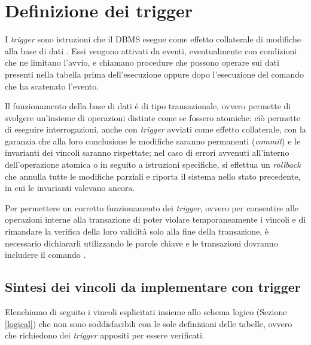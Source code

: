 \FloatBarrier

\section{Definizione dei trigger}
\label{physicaltriggers}

I \emph{trigger} sono istruzioni che il DBMS esegue come effetto collaterale di modifiche alla base di dati \cite{Sil11}.
Essi vengono attivati da eventi, eventualmente con condizioni che ne limitano l'avvio, e chiamano procedure che possono operare sui dati presenti nella tabella prima dell'esecuzione oppure dopo l'esecuzione del comando che ha scatenato l'evento.

Il funzionamento della base di dati è di tipo transazionale, ovvero permette di svolgere un'insieme di operazioni distinte come se fossero atomiche: ciò permette di eseguire interrogazioni, anche con \emph{trigger} avviati come effetto collaterale, con la garanzia che alla loro conclusione le modifiche saranno permanenti (\emph{commit}) e le invarianti dei vincoli saranno rispettate; nel caso di errori avvenuti all'interno dell'operazione atomica o in seguito a istruzioni specifiche, si effettua un \emph{rollback} che annulla tutte le modifiche parziali e riporta il sistema nello stato precedente, in cui le invarianti valevano ancora.

Per permettere un corretto funzionamento dei \emph{trigger}, ovvero per consentire alle operazioni interne alla transazione di poter violare temporaneamente i vincoli e di rimandare la verifica della loro validità solo alla fine della transazione, è necessario dichiararli utilizzando le parole chiave  e le transazioni dovranno includere il comando .

\subsection{Sintesi dei vincoli da implementare con trigger}
\label{physicaltriggerssynthesis}

Elenchiamo di seguito i vincoli esplicitati insieme allo schema logico (Sezione \ref{logical}) che non sono soddisfacibili con le sole definizioni delle tabelle, ovvero che richiedono dei \emph{trigger} appositi per essere verificati.

